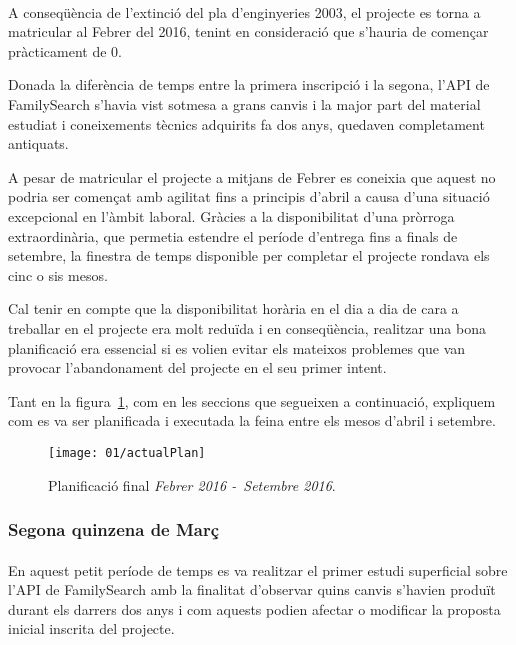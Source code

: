         \paragraph{}
        A  conseqüència de l’extinció del pla d’enginyeries 2003, el projecte es torna a matricular al Febrer del 2016, tenint en consideració que s'hauria de començar pràcticament de 0.

        Donada la diferència de temps entre la primera inscripció i la segona, l’\gls{API} de FamilySearch s'havia vist sotmesa a grans canvis i la major part del material estudiat i coneixements tècnics adquirits fa dos anys, quedaven completament antiquats.

        A pesar de matricular el projecte a mitjans de Febrer es coneixia que aquest no podria ser començat amb agilitat fins a principis d’abril a causa d'una situació excepcional en l'àmbit laboral. Gràcies a la disponibilitat d’una pròrroga extraordinària, que permetia estendre el període d'entrega fins a finals de setembre, la finestra de temps disponible per completar el projecte rondava els cinc o sis mesos.

        Cal tenir en compte que la disponibilitat horària en el dia a dia de cara a treballar en el projecte era molt reduïda i en conseqüència, realitzar una bona planificació era essencial si es volien evitar els mateixos problemes que van provocar l’abandonament del projecte en el seu primer intent.

        Tant en la figura~\ref{fig:actualPlan}, com en les seccions que segueixen a continuació, expliquem com es va ser planificada i executada la feina entre els mesos d'abril i setembre.

        \begin{figure}
            \texttt{[image: 01/actualPlan]}
            \centering
            \caption{Planificació final \emph{Febrer 2016 -\ Setembre 2016}.\label{fig:actualPlan}}
        \end{figure}

        \subsubsection{Segona quinzena de Març}

            \paragraph{}
            En aquest petit període de temps es va realitzar el primer estudi superficial sobre l'API de FamilySearch amb la finalitat d’observar quins canvis s'havien produït durant els darrers dos anys i com aquests podien afectar o modificar la proposta inicial inscrita del projecte.

